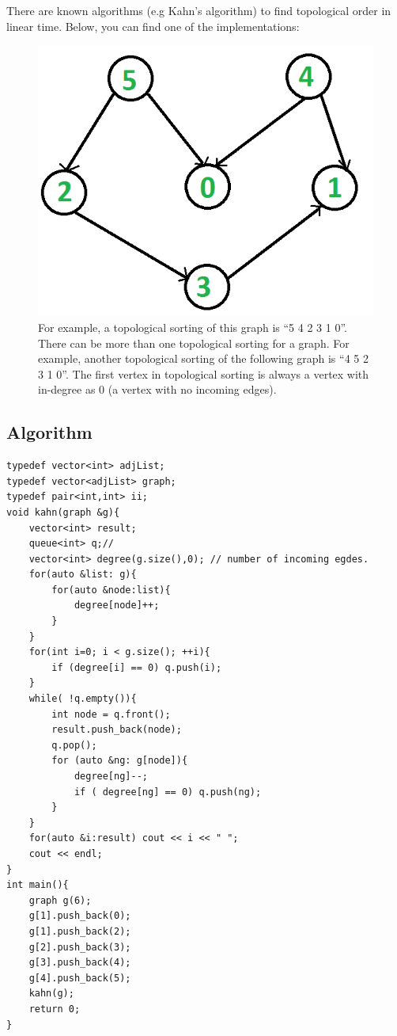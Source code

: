 \documentclass[12pt]{article}
\begin{document}
 There are known algorithms (e.g Kahn's algorithm) to find topological order in linear time. Below, you can find one of the implementations:

\begin{figure}[h!]
\begin{center}
\includegraphics[width=\linewidth/2]{toporder.png}
  \end{center}
\caption{ For example, a topological sorting of this graph is “5 4 2 3 1 0”. There can be more than one topological sorting for a graph. For example, another topological sorting of the following graph is “4 5 2 3 1 0”. The first vertex in topological sorting is always a vertex with in-degree as 0 (a vertex with no incoming edges)\cite{6}.}
  \label{fig}
\end{figure}
\newpage
\subsection{Algorithm}
\begin{verbatim}
typedef vector<int> adjList;
typedef vector<adjList> graph;
typedef pair<int,int> ii;
void kahn(graph &g){
    vector<int> result;
    queue<int> q;// 
    vector<int> degree(g.size(),0); // number of incoming egdes.
    for(auto &list: g){
        for(auto &node:list){
            degree[node]++;
        }
    }
    for(int i=0; i < g.size(); ++i){
        if (degree[i] == 0) q.push(i);
    }
    while( !q.empty()){
        int node = q.front();
        result.push_back(node);
        q.pop();
        for (auto &ng: g[node]){
            degree[ng]--;
            if ( degree[ng] == 0) q.push(ng);
        }
    }
    for(auto &i:result) cout << i << " ";
    cout << endl;
}
int main(){
    graph g(6);
    g[1].push_back(0);
    g[1].push_back(2);
    g[2].push_back(3);
    g[3].push_back(4);
    g[4].push_back(5);
    kahn(g);
    return 0;
}
\end{verbatim}
\end{document}

